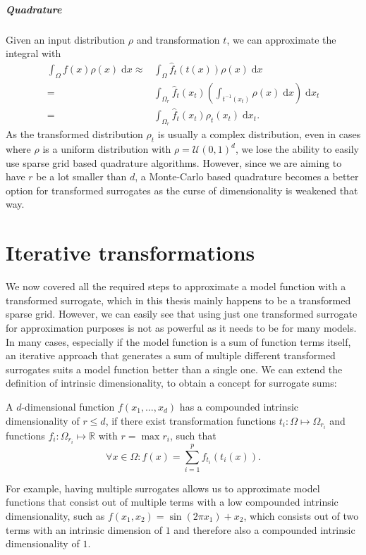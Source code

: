 \documentclass[
  a4paper,  %
  twoside,  %
  bibliography=totoc,
  headsepline,
  cleardoublepage=empty,
  parskip=half,
  draft=false
]{scrbook}
\begin{document}
\paragraph{Quadrature}
Given an input distribution $\rho$ and transformation $t$, we can approximate the integral with
\begin{equation}
\begin{split}
\int_{\Omega} f(x) \rho(x) \; \text{d}x \approx &\int_{\Omega} \hat{f}_t(t(x)) \rho(x) \; \text{d}x\\
=&\int_{\Omega_r} \hat{f}_t(x_t) \left(\int_{t^{-1}(x_t)} \rho(x)  \; \text{d}x \right)  \; \text{d}x_t\\
=&\int_{\Omega_r} \hat{f}_t(x_t) \rho_t(x_t) \; \text{d}x_t.
\end{split}
\end{equation}
As the transformed distribution $\rho_t$ is usually a complex distribution, even in cases where $\rho$ is a uniform  distribution with $\rho=\mathcal{U}(0,1)^d$, we lose the ability to easily use sparse grid based quadrature algorithms.
However, since we are aiming to have $r$ be a lot smaller than $d$, a Monte-Carlo based quadrature becomes a better option for transformed surrogates as the curse of dimensionality is weakened that way.

\chapter{Iterative transformations}
\label{chap:c5}

We now covered all the required steps to approximate a model function with a transformed surrogate, which in this thesis mainly happens to be a transformed sparse grid.
However, we can easily see that using just one transformed surrogate for approximation purposes is not as powerful as it needs to be for many models.
In many cases, especially if the model function is a sum of function terms itself, an iterative approach that generates a sum of multiple different transformed surrogates suits a model function better than a single one.
We can extend the definition of intrinsic dimensionality, to obtain a concept for surrogate sums:
\begin{definition}
A $d$-dimensional function $f(x_1, \dots, x_d)$ has a compounded intrinsic dimensionality of $r \leq d$, if there exist transformation functions $t_i \colon \Omega \mapsto \Omega_{r_i}$ and functions $f_i \colon \Omega_{r_i} \mapsto \mathds{R}$ with $r=\max r_i$, such that
\begin{equation}
\forall x \in \Omega \colon f(x)=\sum_{i=1}^p f_{t_i}(t_i(x)).
\end{equation}
\label{def:intrinsic_sum}
\end{definition}
%
For example, having multiple surrogates allows us to approximate model functions that consist out of multiple terms with a low compounded intrinsic dimensionality, such as $f(x_1, x_2)=\sin(2 \pi x_1) + x_2$, which consists out of two terms with an intrinsic dimension of $1$ and therefore also a compounded intrinsic dimensionality of $1$.
\end{document}
